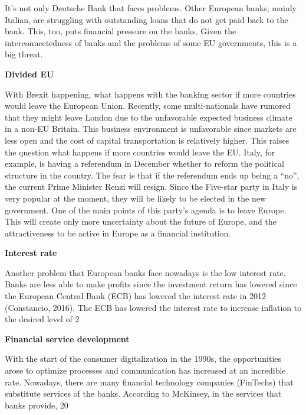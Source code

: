 \documentclass[DIV=calc, paper=a4, fontsize=11pt, twocolumn]{scrartcl}	 %
\begin{document}
It’s not only Deutsche Bank that faces problems. Other European banks, mainly Italian, are struggling with outstanding loans that do not get paid back to the bank. This, too, puts financial pressure on the banks. Given the interconnectedness of banks and the problems of some EU governments, this is a big threat.

\textbf{Divided EU}

With Brexit happening, what happens with the banking sector if more countries would leave the European Union. Recently, some multi-nationals have rumored that they might leave London due to the unfavorable expected business climate in a non-EU Britain. This business environment is unfavorable since markets are less open and the cost of capital transportation is relatively higher. This raises the question what happens if more countries would leave the EU. Italy, for example, is having a referendum in December whether to reform the political structure in the country. The fear is that if the referendum ends up being a “no”, the current Prime Minister Renzi will resign. Since the Five-star party in Italy is very popular at the moment, they will be likely to be elected in the new government. One of the main points of this party’s agenda is to leave Europe. This will create only more uncertainty about the future of Europe, and the attractiveness to be active in Europe as a financial institution. 

\textbf{Interest rate}

Another problem that European banks face nowadays is the low interest rate. Banks are less able to make profits since the investment return has lowered since the European Central Bank (ECB) has lowered the interest rate in 2012 (Constancio, 2016). The ECB has lowered the interest rate to increase inflation to the desired level of 2%

\textbf{Financial service development}

With the start of the consumer digitalization in the 1990s, the opportunities arose to optimize processes and communication has increased at an incredible rate. Nowadays, there are many financial technology companies (FinTechs) that substitute services of the banks. According to McKinsey, in the services that banks provide, 20%
\end{document}
